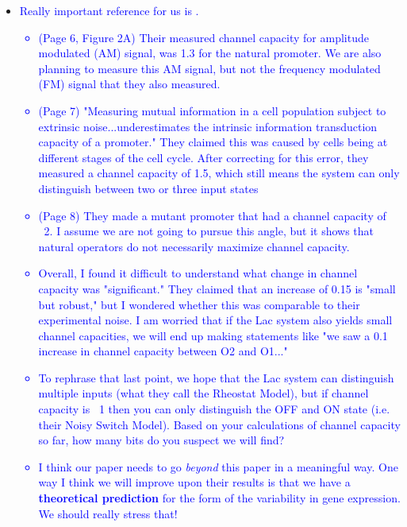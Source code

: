 \begin{itemize}
	
	\item \textcolor{blue}{Really important reference for us is \cite{Hansen2015}.
		\begin{itemize}
			\item (Page 6, Figure 2A) Their measured channel capacity for amplitude modulated (AM) signal, was 1.3 for the natural promoter. We are also planning to measure this AM signal, but not the frequency modulated (FM) signal that they also measured.
			\item (Page 7) "Measuring mutual information in a cell population subject to extrinsic noise...underestimates the intrinsic information transduction capacity of a promoter." They claimed this was caused by cells being at different stages of the cell cycle. After correcting for this error, they measured a channel capacity of 1.5, which still means the system can only distinguish between two or three input states
			\item (Page 8) They made a mutant promoter that had a channel capacity of ~2. I assume we are not going to pursue this angle, but it shows that natural operators do not necessarily maximize channel capacity.
			\item Overall, I found it difficult to understand what change in channel capacity was "significant." They claimed that an increase of 0.15 is "small but robust," but I wondered whether this was comparable to their experimental noise. I am worried that if the Lac system also yields small channel capacities, we will end up making statements like "we saw a 0.1 increase in channel capacity between O2 and O1..."
			\item To rephrase that last point, we hope that the Lac system can distinguish multiple inputs (what they call the Rheostat Model), but if channel capacity is ~1 then you can only distinguish the OFF and ON state (i.e. their Noisy Switch Model). Based on your calculations of channel capacity so far, how many bits do you suspect we will find?
			\item I think our paper needs to go \textit{beyond} this paper in a meaningful way. One way I think we will improve upon their results is that we have a \textbf{theoretical prediction} for the form of the variability in gene expression. We should really stress that!
		\end{itemize}
	}
	

\end{itemize}
